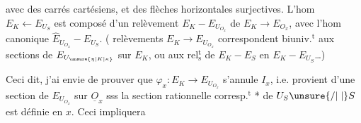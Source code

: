 avec des carrés cartésiens, et des flèches horizontales surjectives. L'hom $E_K\longleftarrow E_{U_S}$ est composé d'un relèvement $E_K-E_{U_{O_x}}$ de $E_K\longrightarrow E_{O_x}$, avec l'hom canonique $\widehat E_{U_{O_x}}-E_{U_S}$. (  relèvements $E_K\longrightarrow E_{U_{O_x}}$ correspondent biuniv.$^{\mathrm t}$ aux sections de $E_{U_{\unsure{\eta|K|\kappa}}}$ sur $E_K$, ou aux rel$^{\mathrm t}_{\mathrm s}$ de $E_K-E_S$ en $E_K-E_{U_S}$\ldots)

Ceci dit, j'ai envie de prouver que $\varphi_x:E_K\longrightarrow E_{U_{O_x}}$ s'annule  $I_x$, i.e. provient d'une section de $E_{U_{O_x}}$ sur $\underline O_x$ sss la section rationnelle corresp.$^{\mathrm t}$ * de $U_S\unsure{/|\mid}S$ est définie en $x$. Ceci impliquera
